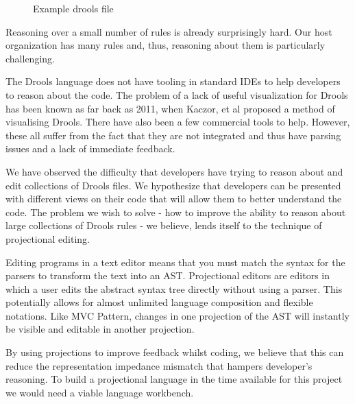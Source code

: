 \begin{figure}[h]
    \centering
    \caption{Example drools file}
    \label{fig:drl_file}
\end{figure}

Reasoning over a small number of rules is already surprisingly hard.
Our host organization has many rules and, thus, reasoning about them is particularly challenging.

The Drools language does not have tooling in standard IDEs to help developers to reason about the code.
The problem of a lack of useful visualization for Drools has been known as far back as 2011, when Kaczor, et al\cite{kaczor2011visual} proposed a method of visualising Drools. 
There have also been a few commercial tools to help.
However, these all suffer from the fact that they are not integrated and thus have parsing issues and a lack of immediate feedback. 

We have observed the difficulty that developers have trying to reason about and edit collections of Drools files.
We hypothesize that developers can be presented with different views on their code that will allow them to better understand the code.
The problem we wish to solve - how to improve the ability to reason about large collections of Drools rules - we believe, lends itself to the technique of projectional editing.

Editing programs in a text editor means that you must match the syntax for the parsers to transform the text into an AST.
Projectional editors are editors in which a user edits the abstract syntax tree directly without using a parser\cite{voelter2014generic}.
This potentially allows for almost unlimited language composition and flexible notations.
Like MVC Pattern, changes in one projection of the AST will instantly be visible and editable in another projection\cite{guttormsen2017consistent}.

By using projections to improve feedback whilst coding, we believe that this can reduce the representation impedance mismatch that hampers developer's reasoning.
To build a projectional language in the time available for this project we would need a viable language workbench.
